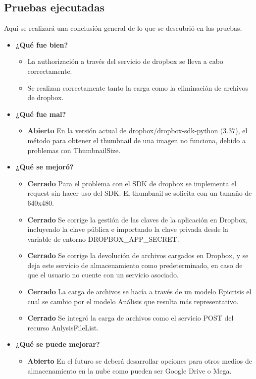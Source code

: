 \subsection{Pruebas ejecutadas}
Aqui se realizará una conclusión general de lo que se descubrió en las pruebas.
	\begin{itemize}
		\item \textbf{¿Qué fue bien?}
        	\begin{itemize}
				\item La authorización a través del servicio de dropbox se lleva a cabo correctamente.
				\item Se realizan correctamente tanto la carga como la eliminación de archivos de dropbox.
			\end{itemize}
		\item \textbf{¿Qué fue mal?}
        	\begin{itemize}
	          \item \textbf{Abierto} En la versión actual de dropbox/dropbox-sdk-python (3.37), el método para obtener el thumbnail de una imagen no funciona, debido a problemas con ThumbnailSize.
			\end{itemize}

   		\item \textbf{¿Qué se mejoró?}
        	\begin{itemize}
                \item \textbf{Cerrado} Para el problema con el SDK de dropbox se implementa el request sin hacer uso del SDK. El thumbnail se solicita con un tamaño de 640x480.
                \item \textbf{Cerrado} Se corrige la gestión de las claves de la aplicación en Dropbox, incluyendo la clave pública e importando la clave privada desde la variable de entorno DROPBOX\_APP\_SECRET.
                \item \textbf{Cerrado} Se corrige la devolución de archivos cargados en Dropbox, y se deja este servicio de almacenamiento como predeterminado, en caso de que el usuario no cuente con un servicio asociado.
                \item \textbf{Cerrado} La carga de archivos se hacía a través de un modelo Epicrisis el cual se cambio por el modelo Análisis que resulta más representativo.
                \item \textbf{Cerrado} Se integró la carga de archivos como el servicio POST del recurso AnlysisFileList.
			\end{itemize}

   		\item \textbf{¿Qué se puede mejorar?}
        	\begin{itemize}
		        \item \textbf{Abierto} En el futuro se deberá desarrollar opciones para otros medios de almacenamiento en la nube como pueden ser Google Drive o Mega.
            \end{itemize}
        

	\end{itemize}